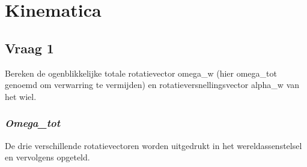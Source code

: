\documentclass{article}
\begin{document}
\section{\textbf{Kinematica}}
\subsection{\textbf{Vraag 1}}
\begin{maplelatex}\begin{Maple Normal}{
Bereken de ogenblikkelijke totale rotatievector omega\_w (hier omega\_tot genoemd om verwarring te vermijden) en rotatieversnellingsvector alpha\_w van het wiel.}\end{Maple Normal}
\end{maplelatex}
\subsubsection{\textbf{\textit{Omega\_tot}}}
\begin{maplelatex}\begin{Maple Normal}{
De drie verschillende rotatievectoren worden uitgedrukt in het wereldassenstelsel en vervolgens opgeteld.}\end{Maple Normal}
\end{maplelatex}
\begin{maplegroup}
\begin{mapleinput}
\end{mapleinput}
\mapleresult
{}
\end{maplegroup}
\begin{maplegroup}
\begin{mapleinput}
\end{mapleinput}
\mapleresult
{}
\end{maplegroup}
\end{document}
